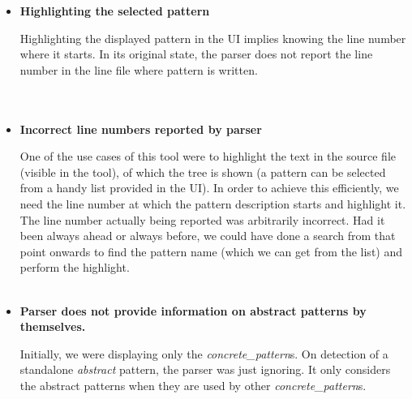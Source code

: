 \begin{itemize}
{}
\item{\textbf{Highlighting the selected pattern}
    \par{Highlighting the displayed pattern in the UI implies knowing the line number where it starts. In its original state, the parser does not report the line number in the line file where pattern is written.} \\
    \\
    \\
}
\item{\textbf{Incorrect line numbers reported by parser}
  \par{One of the use cases of this tool were to highlight the text in the source file (visible in the tool), of which the tree is shown (a pattern can be selected from a handy list provided in the UI). In order to achieve this efficiently, we need the line number at which the pattern description starts and highlight it. The line number actually being reported was arbitrarily incorrect. Had it been always ahead or always before, we could have done a search from that point onwards to find the pattern name (which we can get from the list) and perform the highlight.}\\
   \\
}
\item{\textbf{Parser does not provide information on abstract patterns by themselves.}
  \par{Initially, we were displaying only the \emph{concrete\_pattern}s. On detection of a standalone \emph{abstract} pattern, the parser was just ignoring. It only considers the abstract patterns when they are used by other \emph{concrete\_pattern}s.}
}
\end{itemize}
